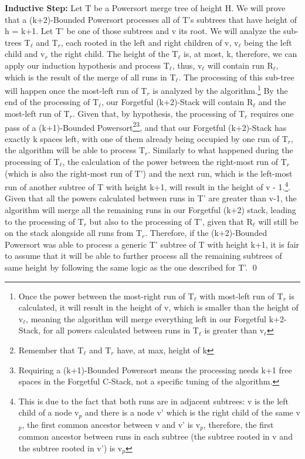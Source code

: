 \documentclass{article}
\begin{document}
\textbf{Inductive Step:} Let T be a Powersort merge tree of height H. We will prove that a (k+2)-Bounded Powersort processes all of T's subtrees that have height of h = k+1. Let T' be one of those subtrees and v its root. We will analyze the sub-trees T$_\ell$ and T$_r$, each rooted in the left and right children of v, v$_\ell$ being the left child and v$_r$ the right child. The height of the T$_\ell$ is, at most, k, therefore, we can apply our induction hypothesis and process T$_\ell$, thus, v$_\ell$ will contain run R$_\ell$, which is the result of the merge of all runs in T$_\ell$. The processing of this sub-tree will happen once the most-left run of T$_r$ is analyzed by the algorithm.\footnote{Once the power between the most-right run of T$_\ell$ with most-left run of T$_r$ is calculated, it will result in the height of v, which is smaller than the height of v$_\ell$, meaning the algorithm will merge everything left in our Forgetful k+2-Stack, for all powers calculated between runs in T$_\ell$ is greater than v$_\ell$} By the end of the processing of T$_\ell$, our Forgetful (k+2)-Stack will contain R$_\ell$ and the most-left run of T$_r$. Given that, by hypothesis, the processing of T$_r$ requires one pass of a (k+1)-Bounded Powersort\footnote{Remember that T$_\ell$ and T$_r$ have, at max, height of k}\footnote{Requiring a (k+1)-Bounded Powersort means the processing needs k+1 free spaces in the Forgetful C-Stack, not a specific tuning of the algorithm.}, and that our Forgetful (k+2)-Stack has exactly k spaces left, with one of them already being occupied by one run of T$_r$, the algorithm will be able to process T$_r$. Similarly to what happened during the processing of T$_\ell$, the calculation of the power between the right-most run of T$_r$ (which is also the right-most run of T') and the next run, which is the left-most run of another subtree of T with height k+1, will result in the height of v - 1.\footnote{This is due to the fact that both runs are in adjacent subtrees: v is the left child of a node v$_p$ and there is a node v' which is the right child of the same v$_p$, the first common ancestor between v and v' is v$_p$, therefore, the first common ancestor between runs in each subtree (the subtree rooted in v and the subtree rooted in v') is v$_p$}. Given that all the powers calculated between runs in T' are greater than v-1, the algorithm will merge all the remaining runs in our Forgetful (k+2) stack, leading to the processing of T$_r$ but also to the processing of T', given that R$_\ell$ will still be on the stack alongside all runs from T$_r$. 
Therefore, if the (k+2)-Bounded Powersort was able to process a generic T' subtree of T with height k+1, it is fair to assume that it will be able to further process all the remaining subtrees of same height by following the same logic as the one described for T'.
\qed
\end{document}
